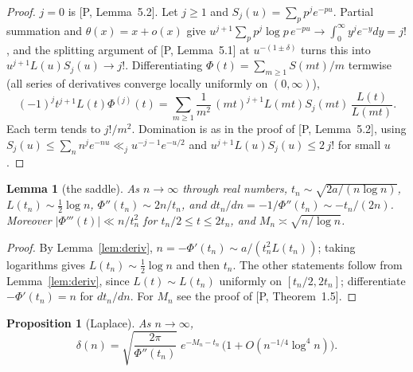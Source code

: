 \documentclass[11pt]{article}
\newtheorem{proposition}[theorem]{Proposition}
\newtheorem{lemma}[theorem]{Lemma}
\theoremstyle{remark}
\begin{document}
\begin{proof}
$j=0$ is [P, Lemma~5.2]. Let $j\ge1$ and $S_j(u)=\sum_pp^je^{-pu}$. Partial summation and
$\theta(x)=x+o(x)$ give $u^{j+1}\sum_pp^j\log p\,e^{-pu}\to\int_0^\infty y^je^{-y}dy=j!$, and the
splitting argument of [P, Lemma~5.1] at $u^{-(1\pm\delta)}$ turns this into
$u^{j+1}L(u)S_j(u)\to j!$. Differentiating $\Phi(t)=\sum_{m\ge1}S(mt)/m$ termwise (all series
of derivatives converge locally uniformly on $(0,\infty)$),
\[
(-1)^jt^{j+1}L(t)\Phi^{(j)}(t)=\sum_{m\ge1}\frac1{m^2}\,(mt)^{j+1}L(mt)S_j(mt)\,
\frac{L(t)}{L(mt)} .
\]
Each term tends to $j!/m^2$. Domination is as in the proof of [P, Lemma~5.2], using
$S_j(u)\le\sum_nn^je^{-nu}\ll_ju^{-j-1}e^{-u/2}$ and $u^{j+1}L(u)S_j(u)\le2\,j!$ for small $u$.
\end{proof}

\begin{lemma}[the saddle]\label{lem:saddle-n}
As $n\to\infty$ through real numbers,
$t_n\sim\sqrt{2a/(n\log n)}$, $L(t_n)\sim\frac12\log n$, $\Phi''(t_n)\sim2n/t_n$, and
$dt_n/dn=-1/\Phi''(t_n)\sim-t_n/(2n)$. Moreover $|\Phi'''(t)|\ll n/t_n^2$ for
$t_n/2\le t\le2t_n$, and $M_n\asymp\sqrt{n/\log n}$.
\end{lemma}

\begin{proof}
By Lemma~\ref{lem:deriv}, $n=-\Phi'(t_n)\sim a/(t_n^2L(t_n))$; taking logarithms gives
$L(t_n)\sim\frac12\log n$ and then $t_n$. The other statements follow from
Lemma~\ref{lem:deriv}, since $L(t)\sim L(t_n)$ uniformly on $[t_n/2,2t_n]$; differentiate
$-\Phi'(t_n)=n$ for $dt_n/dn$. For $M_n$ see the proof of [P, Theorem~1.5].
\end{proof}

\begin{proposition}[Laplace]\label{prop:laplace}
As $n\to\infty$,
\[
\delta(n)=\sqrt{\frac{2\pi}{\Phi''(t_n)}}\;e^{-M_n-t_n}\,\bigl(1+O(n^{-1/4}\log^4n)\bigr).
\]
\end{proposition}
\end{document}
